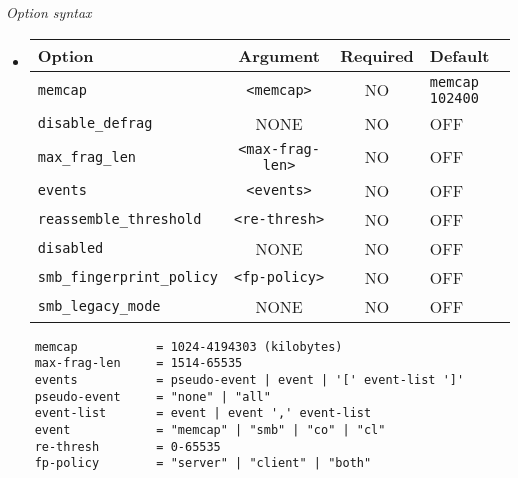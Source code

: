 \documentclass[english]{report}
\begin{document}
\textit{Option syntax}
\begin{itemize}

\item[]
\begin{tabular}{|l|c|c|p{6cm}|}
\hline
Option & Argument & Required & Default\\
\hline
\hline
\texttt{memcap} & \texttt{<memcap>} & NO & \texttt{memcap 102400}\\
\hline
\texttt{disable\_defrag} & NONE & NO & OFF\\
\hline
\texttt{max\_frag\_len} & \texttt{<max-frag-len>} & NO & OFF\\
\hline
\texttt{events} & \texttt{<events>} & NO & OFF\\
\hline
\texttt{reassemble\_threshold} & \texttt{<re-thresh>} & NO & OFF\\
\hline
\texttt{disabled} & NONE & NO & OFF\\
\hline
\texttt{smb\_fingerprint\_policy} & \texttt{<fp-policy>} & NO & OFF\\
\hline
\texttt{smb\_legacy\_mode} & NONE & NO & OFF\\
\hline
\end{tabular}
\end{itemize}

\footnotesize
\begin{verbatim}
    memcap           = 1024-4194303 (kilobytes)
    max-frag-len     = 1514-65535
    events           = pseudo-event | event | '[' event-list ']'
    pseudo-event     = "none" | "all"
    event-list       = event | event ',' event-list
    event            = "memcap" | "smb" | "co" | "cl"
    re-thresh        = 0-65535
    fp-policy        = "server" | "client" | "both"
\end{verbatim}
\normalsize
\end{document}
